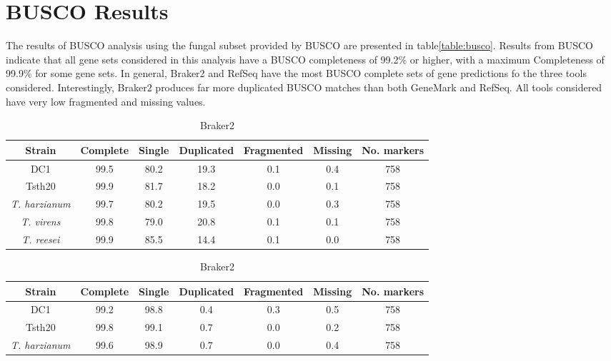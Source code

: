 \section{BUSCO Results}

The results of BUSCO analysis using the fungal subset provided by
BUSCO are presented in table\ref{table:busco}. Results from BUSCO
indicate that all gene sets considered in this analysis have a BUSCO
completeness of 99.2\% or higher, with a maximum Completeness of
99.9\% for some gene sets. In general, Braker2 and RefSeq have the
most BUSCO complete sets of gene predictions fo the three tools
considered. Interestingly, Braker2 produces far more duplicated BUSCO
matches than both GeneMark and RefSeq. All tools considered have very
low fragmented and missing values.

\begin{table}
  \begin{center}
    \begin{subtable}{\textwidth}
      \centering
      \begin{tabular}{|c|c|c|c|c|c|c|}
        \hline
        Strain & Complete & Single & Duplicated & Fragmented & Missing & No. markers \\ \hline
        DC1 & 99.5 & 80.2 & 19.3 & 0.1 & 0.4 & 758 \\ \hline
        Tsth20 & 99.9 & 81.7 & 18.2 & 0.0 & 0.1 & 758 \\ \hline
        \textit{T. harzianum} & 99.7 & 80.2 & 19.5 & 0.0 & 0.3 & 758 \\ \hline
        \textit{T. virens} & 99.8 & 79.0 & 20.8 & 0.1 & 0.1 & 758 \\ \hline
        \textit{T. reesei} & 99.9 & 85.5 & 14.4 & 0.1 & 0.0 & 758 \\ \hline
      \end{tabular}
      \caption{Braker2}
    \end{subtable}
    \begin{subtable}{\textwidth}
      \centering
      \begin{tabular}{|c|c|c|c|c|c|c|}
        \hline
        Strain & Complete & Single & Duplicated & Fragmented & Missing & No. markers \\ \hline
        DC1 & 99.2 & 98.8 & 0.4 & 0.3 & 0.5 & 758 \\ \hline
        Tsth20 & 99.8 & 99.1 & 0.7 & 0.0 & 0.2 & 758 \\ \hline
        \textit{T. harzianum} & 99.6 & 98.9 & 0.7 & 0.0 & 0.4 & 758 \\ \hline

\end{tabular}
\end{subtable}
\end{center}
\end{table}
